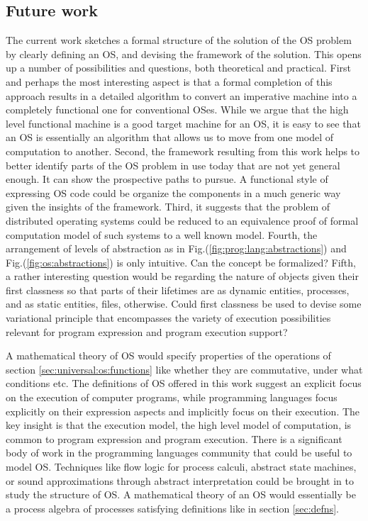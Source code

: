 \documentclass[draft]{article}
\begin{document}
\subsection{Future work}
\label{sec:future}

The current work sketches a formal structure of the solution of the OS
problem by clearly  defining an OS, and devising  the framework of the
solution.  This opens up a number of possibilities and questions, both
theoretical  and practical.   First and  perhaps the  most interesting
aspect  is that  a formal  completion of  this approach  results  in a
detailed algorithm to convert  an imperative machine into a completely
functional one  for conventional OSes.   While we argue that  the high
level functional  machine is a  good target machine  for an OS,  it is
easy to see  that an OS is essentially an algorithm  that allows us to
move from one model of  computation to another.  Second, the framework
resulting  from this work  helps to  better identify  parts of  the OS
problem in use today that are not yet general enough.  It can show the
prospective paths to pursue.  A functional style of expressing OS code
could  be organize  the components  in a  much generic  way  given the
insights of  the framework.   Third, it suggests  that the  problem of
distributed operating systems could be reduced to an equivalence proof
of formal  computation model  of such systems  to a well  known model.
Fourth,   the   arrangement   of   levels   of   abstraction   as   in
Fig.(\ref{fig:prog:lang:abstractions})                             and
Fig.(\ref{fig:os:abstractions}) is only intuitive.  Can the concept be
formalized?  Fifth,  a rather interesting question  would be regarding
the nature  of objects  given their first  classness so that  parts of
their  lifetimes are  as dynamic  entities, processes,  and  as static
entities, files,  otherwise.  Could first classness be  used to devise
some variational  principle that encompasses the  variety of execution
possibilities  relevant for program  expression and  program execution
support?

A mathematical theory of OS would specify properties of the operations
of  section  \ref{sec:universal:os:functions}  like whether  they  are
commutative, under what conditions etc.  The definitions of OS offered
in this  work suggest an explicit  focus on the  execution of computer
programs,  while  programming  languages  focus  explicitly  on  their
expression aspects  and implicitly focus on their  execution.  The key
insight  is  that  the  execution  model,  the  high  level  model  of
computation, is  common to  program expression and  program execution.
There  is a  significant body  of  work in  the programming  languages
community  that could  be useful  to model  OS.  Techniques  like flow
logic  for   process  calculi,  abstract  state   machines,  or  sound
approximations through abstract interpretation  could be brought in to
study  the structure  of OS.   A mathematical  theory of  an  OS would
essentially be  a process algebra of  processes satisfying definitions
like in section \ref{sec:defns}.
\end{document}
